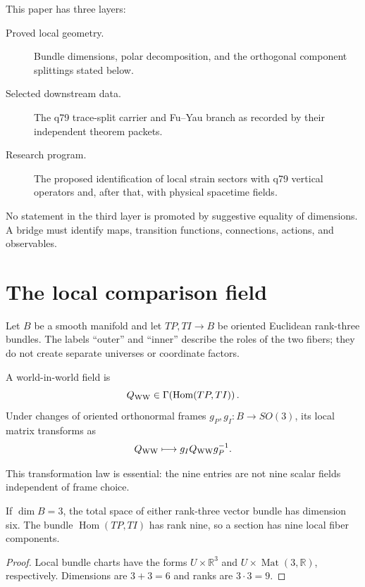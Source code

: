 \documentclass[11pt]{article}
\begin{document}
This paper has three layers:
\begin{description}
\item[Proved local geometry.] Bundle dimensions, polar decomposition, and the
orthogonal component splittings stated below.
\item[Selected downstream data.] The q79 trace-split carrier and Fu--Yau branch
as recorded by their independent theorem packets.
\item[Research program.] The proposed identification of local strain sectors
with q79 vertical operators and, after that, with physical spacetime fields.
\end{description}

No statement in the third layer is promoted by suggestive equality of
dimensions.  A bridge must identify maps, transition functions, connections,
actions, and observables.

\section{The local comparison field}

Let $B$ be a smooth manifold and let $TP,TI\to B$ be oriented Euclidean
rank-three bundles.  The labels ``outer'' and ``inner'' describe the roles of
the two fibers; they do not create separate universes or coordinate factors.

\begin{definition}
A world-in-world field is
\[
 Q_{\rm WW}\in\Gamma\!\left(\operatorname{Hom}(TP,TI)\right).
\]
Under changes of oriented orthonormal frames
$g_P,g_I:B\to SO(3)$, its local matrix transforms as
\[
 Q_{\rm WW}\longmapsto g_I Q_{\rm WW}g_P^{-1}.
\]
\end{definition}

This transformation law is essential: the nine entries are not nine scalar
fields independent of frame choice.

\begin{theorem}
If $\dim B=3$, the total space of either rank-three vector bundle has dimension
six.  The bundle $\operatorname{Hom}(TP,TI)$ has rank nine, so a section has
nine local fiber components.
\end{theorem}

\begin{proof}
Local bundle charts have the forms $U\times\mathbb R^3$ and
$U\times\operatorname{Mat}(3,\mathbb R)$, respectively.  Dimensions are
$3+3=6$ and ranks are $3\cdot3=9$.
\end{proof}
\end{document}

